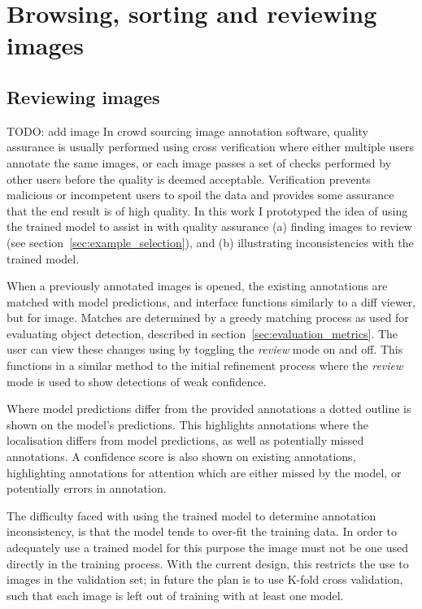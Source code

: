 \section{Browsing, sorting and reviewing images}
\label{sec:browising}


\subsection{Reviewing images}
\label{sec:reviewing}
TODO: add image
In crowd sourcing image annotation software, quality assurance is usually performed using cross verification where  either multiple users annotate the same images, or each image passes a set of checks performed by other users before the quality is deemed acceptable. Verification prevents malicious or incompetent users to spoil the data and provides some assurance that the end result is of high quality. In this work I prototyped the idea of using the trained model to assist in with quality assurance (a) finding images to review (see section~\ref{sec:example_selection}), and (b) illustrating inconsistencies with the trained model.

When a previously annotated images is opened, the existing annotations are matched with model predictions, and interface functions similarly to a diff viewer, but for image. Matches are determined by a greedy matching process as used for evaluating object detection, described in section~\ref{sec:evaluation_metrics}. The user can view these changes using by toggling the \emph{review} mode on and off. This functions in a similar method to the initial refinement process where the \emph{review} mode is used to show detections of weak confidence. 

Where model predictions differ from the provided annotations a dotted outline is shown on the model's predictions. This highlights annotations where the localisation differs from model predictions, as well as potentially missed annotations. A confidence score is also shown on existing annotations, highlighting annotations for attention which are either missed by the model, or potentially errors in annotation.

The difficulty faced with using the trained model to determine annotation inconsistency, is that the model tends to over-fit the training data. In order to adequately use a trained model for this purpose the image must not be one used directly in the training process. With the current design, this restricts the use to images in the validation set; in future the plan is to use K-fold cross validation, such that each image is left out of training with at least one model. 

